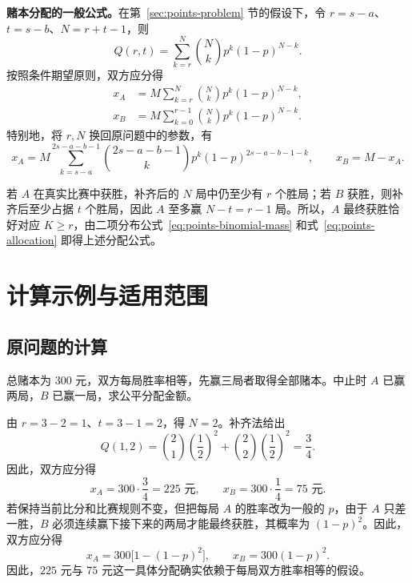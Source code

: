 \documentclass[UTF8,12pt,a4paper,fontset=fandol]{ctexart}
\begin{document}
\textbf{赌本分配的一般公式。}在第~\ref{sec:points-problem} 节的假设下，令 $r=s-a$、$t=s-b$、$N=r+t-1$，则
\begin{equation}
  Q(r,t)=\sum_{k=r}^{N}\binom Nk p^k(1-p)^{N-k}.
  \label{eq:points-binomial-tail}
\end{equation}
按照条件期望原则，双方应分得
\begin{equation}
  \boxed{
  \begin{aligned}
    x_A&=M\sum_{k=r}^{N}\binom Nk p^k(1-p)^{N-k},\\
    x_B&=M\sum_{k=0}^{r-1}\binom Nk p^k(1-p)^{N-k}.
  \end{aligned}}
  \label{eq:points-general-shares}
\end{equation}
特别地，将 $r,N$ 换回原问题中的参数，有
\begin{equation}
  x_A=M\sum_{k=s-a}^{2s-a-b-1}
    \binom{2s-a-b-1}{k}p^k(1-p)^{2s-a-b-1-k},
  \qquad x_B=M-x_A.
  \label{eq:points-original-parameters}
\end{equation}

若 $A$ 在真实比赛中获胜，补齐后的 $N$ 局中仍至少有 $r$ 个胜局；若 $B$ 获胜，则补齐后至少占据 $t$ 个胜局，因此 $A$ 至多赢 $N-t=r-1$ 局。所以，$A$ 最终获胜恰好对应 $K\ge r$，由二项分布公式~\eqref{eq:points-binomial-mass} 和式~\eqref{eq:points-allocation} 即得上述分配公式。

\section{计算示例与适用范围}
\label{sec:points-examples}

\subsection{原问题的计算}

\begin{example}
\label{ex:points-original}
总赌本为 $300$ 元，双方每局胜率相等，先赢三局者取得全部赌本。中止时 $A$ 已赢两局，$B$ 已赢一局，求公平分配金额。
\end{example}

\begin{solve}
由 $r=3-2=1$、$t=3-1=2$，得 $N=2$。补齐法给出
\[
  Q(1,2)=\binom21\left(\frac12\right)^2
          +\binom22\left(\frac12\right)^2
        =\frac34.
\]
因此，双方应分得
\[
  x_A=300\cdot\frac34=225\text{ 元},\qquad
  x_B=300\cdot\frac14=75\text{ 元}.
\]
若保持当前比分和比赛规则不变，但把每局 $A$ 的胜率改为一般的 $p$，由于 $A$ 只差一胜，$B$ 必须连续赢下接下来的两局才能最终获胜，其概率为 $(1-p)^2$。因此，双方应分得
\[
  x_A=300\bigl[1-(1-p)^2\bigr],\qquad x_B=300(1-p)^2.
\]
因此，$225$ 元与 $75$ 元这一具体分配确实依赖于每局双方胜率相等的假设。
\end{solve}
\end{document}
